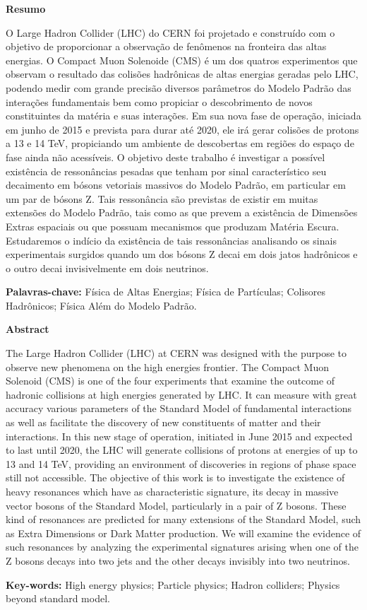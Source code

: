\begin{flushleft}
{\large\textbf{Resumo}}
\end{flushleft}
\noindent
O Large Hadron Collider (LHC) do CERN foi projetado e construído com o objetivo de proporcionar a observação de fenômenos na fronteira das altas energias. O Compact Muon Solenoide (CMS) é um dos quatros experimentos que observam o resultado das colisões hadrônicas de altas energias geradas pelo LHC, podendo medir com grande precisão diversos parâmetros do Modelo Padrão das interações fundamentais bem como propiciar o descobrimento de novos constituintes da matéria e suas interações. Em sua nova fase de operação, iniciada em junho de 2015 e prevista para durar até 2020, ele irá gerar colisões de protons a 13 e 14 TeV, propiciando um ambiente de descobertas em regiões do espaço de fase ainda não acessíveis. O objetivo deste trabalho é investigar a possível existência de ressonâncias pesadas que tenham por sinal característico seu decaimento em bósons vetoriais massivos do Modelo Padrão, em particular em um par de bósons Z. Tais ressonância são previstas de existir em muitas extensões do Modelo Padrão, tais como as que prevem a existência de Dimensões Extras espaciais ou que possuam mecanismos que produzam Matéria Escura. Estudaremos o indício da existência de tais ressonâncias analisando os sinais experimentais surgidos quando um dos bósons Z decai em dois jatos hadrônicos e o outro decai invisivelmente em dois neutrinos.

\begin{flushleft}
{\textbf{Palavras-chave:} Física de Altas Energias; Física de Partículas; Colisores Hadrônicos; Física Além do Modelo Padrão.}
\end{flushleft}

\newpage

\begin{flushleft}
{\large\textbf{Abstract}}
\end{flushleft}
\noindent
The Large Hadron Collider (LHC) at CERN was designed with the purpose to observe new phenomena on the high energies frontier. The Compact Muon Solenoid (CMS) is one of the four experiments that examine the outcome of hadronic collisions at high energies generated by LHC. It can measure with great accuracy various parameters of the Standard Model of fundamental interactions as well as facilitate the discovery of new constituents of matter and their interactions.
In this new stage of operation, initiated in June 2015 and expected to last until 2020, the LHC will generate collisions of protons at energies of up to 13 and 14 TeV, providing an environment of discoveries in regions of phase space still not accessible. The objective of this work is to investigate the existence of heavy resonances which have as characteristic signature, its decay in massive vector bosons of the Standard Model, particularly in a pair of Z bosons.
These kind of resonances are predicted for many extensions of the Standard Model, such as Extra Dimensions or Dark Matter production. We will examine the evidence of such resonances by analyzing the experimental signatures arising when one of the Z bosons decays into two jets and the other decays invisibly into two neutrinos.

\begin{flushleft}
{\textbf{Key-words:} High energy physics; Particle physics; Hadron colliders; Physics beyond standard model.}
\end{flushleft}